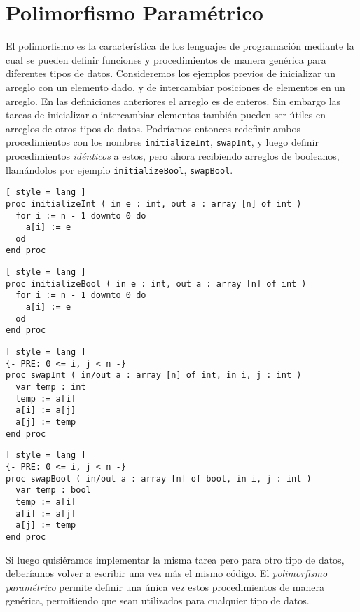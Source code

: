 \section{Polimorfismo Paramétrico}

El polimorfismo es la característica de los lenguajes de programación mediante la cual se pueden definir funciones y procedimientos de manera genérica para diferentes tipos de datos.
Consideremos los ejemplos previos de inicializar un arreglo con un elemento dado, y de intercambiar posiciones de elementos en un arreglo.
En las definiciones anteriores el arreglo es de enteros.
Sin embargo las tareas de inicializar o intercambiar elementos también pueden ser útiles en arreglos de otros tipos de datos.
Podríamos entonces redefinir ambos procedimientos con los nombres \lstinline[style = lang]{initializeInt}, \lstinline[style = lang]{swapInt}, y luego definir procedimientos \textit{idénticos} a estos, pero ahora recibiendo arreglos de booleanos, llamándolos por ejemplo \lstinline[style = lang]{initializeBool}, \lstinline[style = lang]{swapBool}.

\begin{lstlisting}[ style = lang ]
proc initializeInt ( in e : int, out a : array [n] of int )
  for i := n - 1 downto 0 do
    a[i] := e
  od
end proc
\end{lstlisting}

\begin{lstlisting}[ style = lang ]
proc initializeBool ( in e : int, out a : array [n] of int )
  for i := n - 1 downto 0 do
    a[i] := e
  od
end proc
\end{lstlisting}

\begin{lstlisting}[ style = lang ]
{- PRE: 0 <= i, j < n -}
proc swapInt ( in/out a : array [n] of int, in i, j : int )
  var temp : int
  temp := a[i]
  a[i] := a[j]
  a[j] := temp
end proc
\end{lstlisting}

\begin{lstlisting}[ style = lang ]
{- PRE: 0 <= i, j < n -}
proc swapBool ( in/out a : array [n] of bool, in i, j : int )
  var temp : bool
  temp := a[i]
  a[i] := a[j]
  a[j] := temp
end proc
\end{lstlisting}

Si luego quisiéramos implementar la misma tarea pero para otro tipo de datos, deberíamos volver a escribir una vez más el mismo código.
El \textit{polimorfismo paramétrico} permite definir una única vez estos procedimientos de manera genérica, permitiendo que sean utilizados para cualquier tipo de datos.

